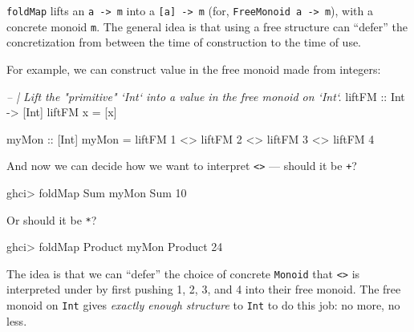 \documentclass[]{article}
\newenvironment{Shaded}{}{}
\newcommand{\CommentTok}[1]{\textcolor[rgb]{0.38,0.63,0.69}{\textit{#1}}}
\newcommand{\DataTypeTok}[1]{\textcolor[rgb]{0.56,0.13,0.00}{#1}}
\newcommand{\DecValTok}[1]{\textcolor[rgb]{0.25,0.63,0.44}{#1}}
\newcommand{\FunctionTok}[1]{\textcolor[rgb]{0.02,0.16,0.49}{#1}}
\newcommand{\NormalTok}[1]{#1}
\newcommand{\OtherTok}[1]{\textcolor[rgb]{0.00,0.44,0.13}{#1}}
\begin{document}
\texttt{foldMap} lifts an \texttt{a\ -\textgreater{}\ m} into a
\texttt{{[}a{]}\ -\textgreater{}\ m} (for,
\texttt{FreeMonoid\ a\ -\textgreater{}\ m}), with a concrete monoid \texttt{m}.
The general idea is that using a free structure can ``defer'' the concretization
from between the time of construction to the time of use.

For example, we can construct value in the free monoid made from integers:

\begin{Shaded}
\begin{Highlighting}[]
\CommentTok{-- | Lift the "primitive" `Int` into a value in the free monoid on `Int`.}
\OtherTok{liftFM ::} \DataTypeTok{Int} \OtherTok{->}\NormalTok{ [}\DataTypeTok{Int}\NormalTok{]}
\NormalTok{liftFM x }\FunctionTok{=}\NormalTok{ [x]}

\OtherTok{myMon ::}\NormalTok{ [}\DataTypeTok{Int}\NormalTok{]}
\NormalTok{myMon }\FunctionTok{=}\NormalTok{ liftFM }\DecValTok{1} \FunctionTok{<>}\NormalTok{ liftFM }\DecValTok{2} \FunctionTok{<>}\NormalTok{ liftFM }\DecValTok{3} \FunctionTok{<>}\NormalTok{ liftFM }\DecValTok{4}
\end{Highlighting}
\end{Shaded}

And now we can decide how we want to interpret
\texttt{\textless{}\textgreater{}} --- should it be \texttt{+}?

\begin{Shaded}
\begin{Highlighting}[]
\NormalTok{ghci}\FunctionTok{>} \FunctionTok{foldMap} \DataTypeTok{Sum}\NormalTok{ myMon}
\DataTypeTok{Sum} \DecValTok{10}
\end{Highlighting}
\end{Shaded}

Or should it be \texttt{*}?

\begin{Shaded}
\begin{Highlighting}[]
\NormalTok{ghci}\FunctionTok{>} \FunctionTok{foldMap} \DataTypeTok{Product}\NormalTok{ myMon}
\DataTypeTok{Product} \DecValTok{24}
\end{Highlighting}
\end{Shaded}

The idea is that we can ``defer'' the choice of concrete \texttt{Monoid} that
\texttt{\textless{}\textgreater{}} is interpreted under by first pushing 1, 2,
3, and 4 into their free monoid. The free monoid on \texttt{Int} gives
\emph{exactly enough structure} to \texttt{Int} to do this job: no more, no
less.
\end{document}
